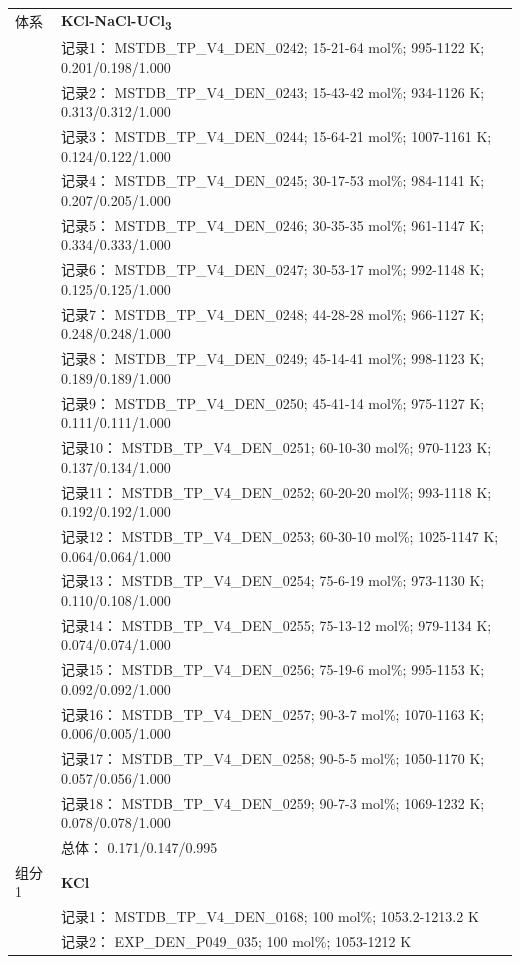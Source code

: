 \documentclass[12pt]{article}
\begin{document}
{\begin{longtable}[]{@{}
  >{\raggedright\arraybackslash}p{}
  >{\raggedright\arraybackslash}p{}@{}}
\midrule
体系 & \textbf{KCl-NaCl-UCl\textsubscript{3}} \\
 & 记录1： MSTDB\_TP\_V4\_DEN\_0242; 15-21-64 mol\%; 995-1122 K; 0.201/0.198/1.000 \\
 & 记录2： MSTDB\_TP\_V4\_DEN\_0243; 15-43-42 mol\%; 934-1126 K; 0.313/0.312/1.000 \\
 & 记录3： MSTDB\_TP\_V4\_DEN\_0244; 15-64-21 mol\%; 1007-1161 K; 0.124/0.122/1.000 \\
 & 记录4： MSTDB\_TP\_V4\_DEN\_0245; 30-17-53 mol\%; 984-1141 K; 0.207/0.205/1.000 \\
 & 记录5： MSTDB\_TP\_V4\_DEN\_0246; 30-35-35 mol\%; 961-1147 K; 0.334/0.333/1.000 \\
 & 记录6： MSTDB\_TP\_V4\_DEN\_0247; 30-53-17 mol\%; 992-1148 K; 0.125/0.125/1.000 \\
 & 记录7： MSTDB\_TP\_V4\_DEN\_0248; 44-28-28 mol\%; 966-1127 K; 0.248/0.248/1.000 \\
 & 记录8： MSTDB\_TP\_V4\_DEN\_0249; 45-14-41 mol\%; 998-1123 K; 0.189/0.189/1.000 \\
 & 记录9： MSTDB\_TP\_V4\_DEN\_0250; 45-41-14 mol\%; 975-1127 K; 0.111/0.111/1.000 \\
 & 记录10： MSTDB\_TP\_V4\_DEN\_0251; 60-10-30 mol\%; 970-1123 K; 0.137/0.134/1.000 \\
 & 记录11： MSTDB\_TP\_V4\_DEN\_0252; 60-20-20 mol\%; 993-1118 K; 0.192/0.192/1.000 \\
 & 记录12： MSTDB\_TP\_V4\_DEN\_0253; 60-30-10 mol\%; 1025-1147 K; 0.064/0.064/1.000 \\
 & 记录13： MSTDB\_TP\_V4\_DEN\_0254; 75-6-19 mol\%; 973-1130 K; 0.110/0.108/1.000 \\
 & 记录14： MSTDB\_TP\_V4\_DEN\_0255; 75-13-12 mol\%; 979-1134 K; 0.074/0.074/1.000 \\
 & 记录15： MSTDB\_TP\_V4\_DEN\_0256; 75-19-6 mol\%; 995-1153 K; 0.092/0.092/1.000 \\
 & 记录16： MSTDB\_TP\_V4\_DEN\_0257; 90-3-7 mol\%; 1070-1163 K; 0.006/0.005/1.000 \\
 & 记录17： MSTDB\_TP\_V4\_DEN\_0258; 90-5-5 mol\%; 1050-1170 K; 0.057/0.056/1.000 \\
 & 记录18： MSTDB\_TP\_V4\_DEN\_0259; 90-7-3 mol\%; 1069-1232 K; 0.078/0.078/1.000 \\
 & 总体： 0.171/0.147/0.995  \\

组分 1  & \textbf{KCl} \\
 & 记录1： MSTDB\_TP\_V4\_DEN\_0168; 100 mol\%; 1053.2-1213.2 K \\
 & 记录2： EXP\_DEN\_P049\_035; 100 mol\%; 1053-1212 K  \\


\end{longtable}}
\end{document}
